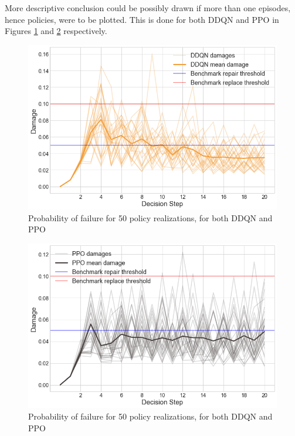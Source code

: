 \newpage

More descriptive conclusion could be possibly drawn if more than one episodes, hence policies, were to be plotted. This is done for both \gls{DDQN} and \gls{PPO} in Figures \ref{polDDQN} and \ref{polPPO} respectively.

\begin{figure}[H]
    \centering
	\includegraphics[width=0.75\linewidth]{Figures/policiesDDQNmean.png}
	\caption{Probability of failure for 50 policy realizations, for both \gls{DDQN} and \gls{PPO}}
	\label{polDDQN}
\end{figure}

\begin{figure}[H]
    \centering
	\includegraphics[width=0.75\linewidth]{Figures/policiesPPOmean.png}
	\caption{Probability of failure for 50 policy realizations, for both \gls{DDQN} and \gls{PPO}}
	\label{polPPO}
\end{figure}

